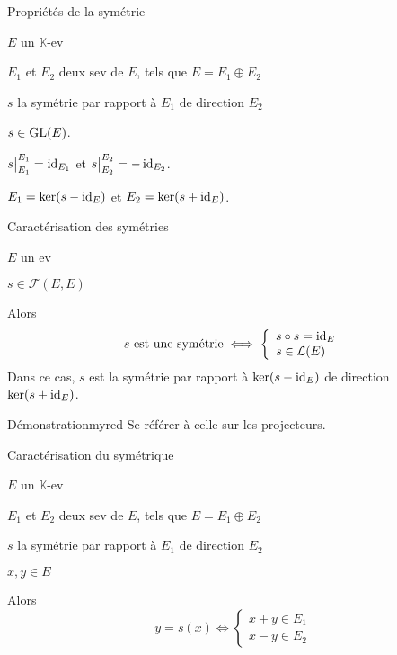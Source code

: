     \begin{prop}{Propriétés de la symétrie}{}
        \begin{soient}
            \item $E$ un $\mathbb{K}$-ev
            \item $E_1$ et $E_2$ deux sev de $E$, tels que $E = E_1 \oplus E_2$
            \item $s$ la symétrie par rapport à $E_1$ de direction $E_2$
        \end{soient}
        \begin{alors}
            \item $s \in \operatorname{GL}(E)$.
            \item $\left.\kern-\nulldelimiterspace s \vphantom{\big|} \right|_{E_1}^{E_1} = \id_{E_1}$ et $\left.\kern-\nulldelimiterspace s \vphantom{\big|} \right|_{E_2}^{E_2} = - \id_{E_2}$.
            \item $E_1 = \ker(s-\operatorname{id}_E)$ et $E_2 = \ker(s + \operatorname{id}_E)$.
        \end{alors}
    \end{prop}
    
    \begin{theo}{Caractérisation des symétries}{}
        \begin{soient}
            \item $E$ un ev
            \item $s \in \mathcal{F}(E,E)$
        \end{soient}
        Alors \[ s \text{ est une symétrie} \iff \left\{ \begin{array}{l}
            s \circ s = \operatorname{id}_E \\
            s \in \mathcal{L}(E)
        \end{array} \right. \]
        Dans ce cas, $s$ est la symétrie par rapport à $\ker(s-\operatorname{id}_E)$ de direction $\ker(s + \operatorname{id}_E)$.
    \end{theo}
    
    \begin{demo}{Démonstration}{myred}
        Se référer à celle sur les projecteurs.
    \end{demo}
    
    \begin{prop}{Caractérisation du symétrique}{}
        \begin{soient}
            \item $E$ un $\mathbb{K}$-ev
            \item $E_1$ et $E_2$ deux sev de $E$, tels que $E = E_1 \oplus E_2$
            \item $s$ la symétrie par rapport à $E_1$ de direction $E_2$
            \item $x,y \in E$
        \end{soient}
        Alors \[ y = s(x) \iff \left\{ \begin{array}{l}
            x + y \in E_1 \\
            x - y \in E_2
        \end{array} \right. \]
    \end{prop}
    
